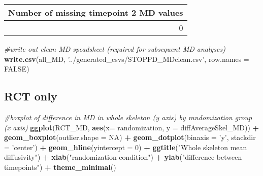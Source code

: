 \documentclass[]{article}
\newenvironment{Shaded}{\begin{snugshade}}{\end{snugshade}}
\newcommand{\KeywordTok}[1]{\textcolor[rgb]{0.13,0.29,0.53}{\textbf{#1}}}
\newcommand{\DataTypeTok}[1]{\textcolor[rgb]{0.13,0.29,0.53}{#1}}
\newcommand{\DecValTok}[1]{\textcolor[rgb]{0.00,0.00,0.81}{#1}}
\newcommand{\StringTok}[1]{\textcolor[rgb]{0.31,0.60,0.02}{#1}}
\newcommand{\CommentTok}[1]{\textcolor[rgb]{0.56,0.35,0.01}{\textit{#1}}}
\newcommand{\OtherTok}[1]{\textcolor[rgb]{0.56,0.35,0.01}{#1}}
\newcommand{\OperatorTok}[1]{\textcolor[rgb]{0.81,0.36,0.00}{\textbf{#1}}}
\newcommand{\NormalTok}[1]{#1}
\theoremstyle{definition}
\theoremstyle{definition}
\theoremstyle{definition}
\theoremstyle{remark}
\begin{document}
\begin{Shaded}
\end{Shaded}

\begin{tabular}{r}
\hline
Number of missing timepoint 2 MD values\\
\hline
0\\
\hline
\end{tabular}

\begin{Shaded}
\begin{Highlighting}[]
\CommentTok{#write out clean MD speadsheet (required for subsequent MD analyses)}
\KeywordTok{write.csv}\NormalTok{(all_MD, }\StringTok{'../generated_csvs/STOPPD_MDclean.csv'}\NormalTok{, }\DataTypeTok{row.names =} \OtherTok{FALSE}\NormalTok{)}
\end{Highlighting}
\end{Shaded}

\subsection{RCT only}\label{rct-only-3}

\begin{Shaded}
\begin{Highlighting}[]
\CommentTok{#boxplot of difference in MD in whole skeleton (y axis) by randomization group (x axis)}
\KeywordTok{ggplot}\NormalTok{(RCT_MD, }\KeywordTok{aes}\NormalTok{(}\DataTypeTok{x=}\NormalTok{ randomization, }\DataTypeTok{y =}\NormalTok{ diffAverageSkel_MD)) }\OperatorTok{+}\StringTok{ }
\StringTok{   }\KeywordTok{geom_boxplot}\NormalTok{(}\DataTypeTok{outlier.shape =} \OtherTok{NA}\NormalTok{) }\OperatorTok{+}\StringTok{ }
\StringTok{   }\KeywordTok{geom_dotplot}\NormalTok{(}\DataTypeTok{binaxis =} \StringTok{'y'}\NormalTok{, }\DataTypeTok{stackdir =} \StringTok{'center'}\NormalTok{) }\OperatorTok{+}
\StringTok{   }\KeywordTok{geom_hline}\NormalTok{(}\DataTypeTok{yintercept =} \DecValTok{0}\NormalTok{) }\OperatorTok{+}
\StringTok{   }\KeywordTok{ggtitle}\NormalTok{(}\StringTok{"Whole skeleton mean diffusivity"}\NormalTok{) }\OperatorTok{+}
\StringTok{   }\KeywordTok{xlab}\NormalTok{(}\StringTok{"randomization condition"}\NormalTok{) }\OperatorTok{+}\StringTok{  }
\StringTok{   }\KeywordTok{ylab}\NormalTok{(}\StringTok{"difference between timepoints"}\NormalTok{) }\OperatorTok{+}
\StringTok{   }\KeywordTok{theme_minimal}\NormalTok{()}
\end{Highlighting}
\end{Shaded}
\end{document}
